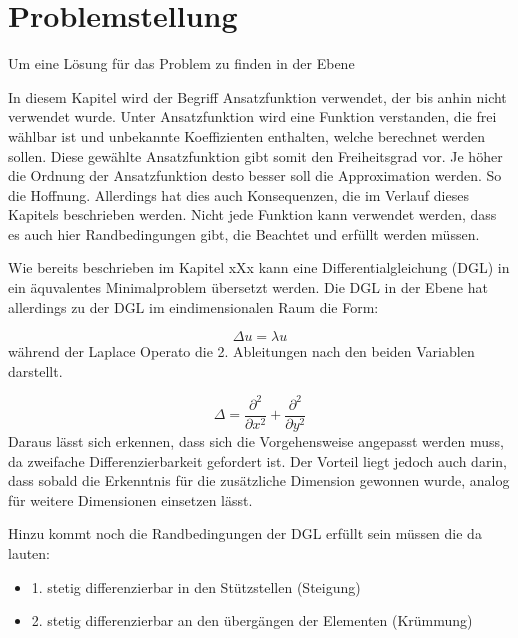 %
%
%
\section{Problemstellung
\label{fem:section:problemstellung}}

Um eine Lösung für das Problem zu finden in der Ebene

In diesem Kapitel wird der Begriff Ansatzfunktion verwendet, der bis anhin nicht verwendet wurde. Unter Ansatzfunktion wird eine Funktion verstanden, die frei wählbar ist und unbekannte Koeffizienten enthalten, welche berechnet werden sollen. Diese gewählte Ansatzfunktion gibt somit den Freiheitsgrad vor. Je höher die Ordnung der Ansatzfunktion desto besser soll die Approximation werden. So die Hoffnung. Allerdings hat dies auch Konsequenzen, die im Verlauf dieses Kapitels beschrieben werden. Nicht jede Funktion kann verwendet werden, dass es auch hier Randbedingungen gibt, die Beachtet und erfüllt werden müssen.

Wie bereits beschrieben im Kapitel xXx kann eine Differentialgleichung (DGL) in ein äquvalentes Minimalproblem übersetzt werden. Die DGL in der Ebene hat allerdings zu der DGL im eindimensionalen Raum die Form:

\begin{equation}
	\Delta u = \lambda u
	\label{fem:DGL2D}
\end{equation} 
während der Laplace Operato die 2. Ableitungen nach den beiden Variablen darstellt.

\begin{equation}
	\Delta = \frac{\partial ^2}{\partial x^2} + \frac{\partial ^2}{\partial y^2}
\end{equation} 
Daraus lässt sich erkennen, dass sich die Vorgehensweise angepasst werden muss, da zweifache Differenzierbarkeit gefordert ist. Der Vorteil liegt jedoch auch darin, dass sobald die Erkenntnis für die zusätzliche Dimension gewonnen wurde, analog für weitere Dimensionen einsetzen lässt.

Hinzu kommt noch die Randbedingungen der DGL erfüllt sein müssen die da lauten:
\begin{itemize}
	\item 1. stetig differenzierbar in den Stützstellen (Steigung)
	\item 2. stetig differenzierbar an den übergängen der Elementen (Krümmung)
\end{itemize}

